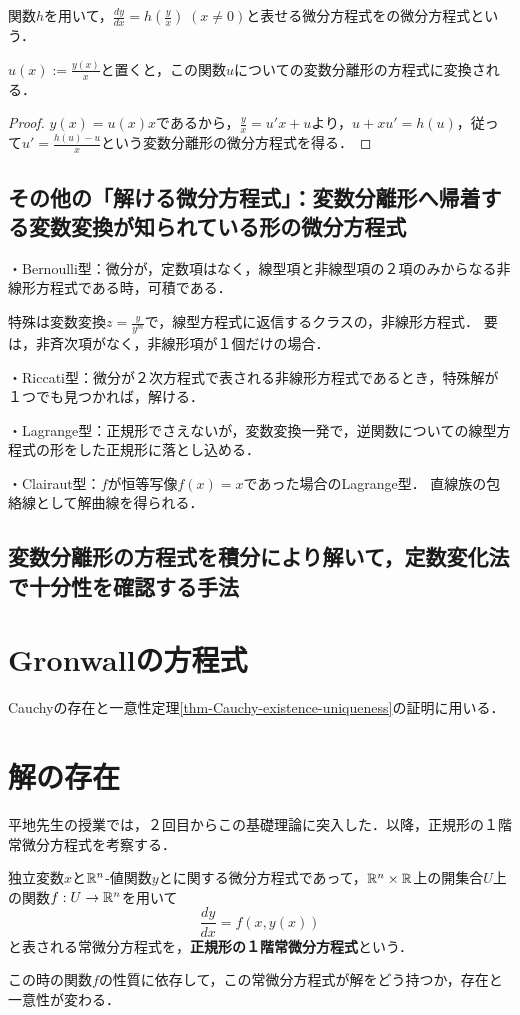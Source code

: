 \documentclass[uplatex,dvipdfmx]{jsreport}
\begin{document}
\begin{proposition}[同次形の方程式の解法]
    関数$h$を用いて，$\frac{dy}{dx}=h\left(\frac{y}{x}\right)\;(x\ne 0)$と表せる微分方程式をの微分方程式という．

    $u(x):=\frac{y(x)}{x}$と置くと，この関数$u$についての変数分離形の方程式に変換される．
\end{proposition}
\begin{proof}
    $y(x)=u(x)x$であるから，$\frac{y}{x}=u'x+u$より，$u+xu'=h(u)$，従って$u'=\frac{h(u)-u}{x}$という変数分離形の微分方程式を得る．
\end{proof}

\subsection{その他の「解ける微分方程式」：変数分離形へ帰着する変数変換が知られている形の微分方程式}

・Bernoulli型：微分が，定数項はなく，線型項と非線型項の２項のみからなる非線形方程式である時，可積である．

特殊は変数変換$z=\frac{y}{y^m}$で，線型方程式に返信するクラスの，非線形方程式．
要は，非斉次項がなく，非線形項が１個だけの場合．

・Riccati型：微分が２次方程式で表される非線形方程式であるとき，特殊解が１つでも見つかれば，解ける．

・Lagrange型：正規形でさえないが，変数変換一発で，逆関数についての線型方程式の形をした正規形に落とし込める．

・Clairaut型：$f$が恒等写像$f(x)=x$であった場合のLagrange型．
直線族の包絡線として解曲線を得られる．

\subsection{変数分離形の方程式を積分により解いて，定数変化法で十分性を確認する手法}

\section{Gronwallの方程式}
Cauchyの存在と一意性定理\ref{thm-Cauchy-existence-uniqueness}の証明に用いる．
\section{解の存在}
平地先生の授業では，２回目からこの基礎理論に突入した．以降，正規形の１階常微分方程式を考察する．
\begin{definition}
    独立変数$x$と$\mathbb{R}^n$-値関数$y$とに関する微分方程式であって，$\mathbb{R}^n\times\mathbb{R}$上の開集合$U$上の関数$f:U\to\mathbb{R}^n$を用いて
    \[\frac{dy}{dx}=f(x,y(x))\]
    と表される常微分方程式を，\textbf{正規形の１階常微分方程式}という．
\end{definition}
この時の関数$f$の性質に依存して，この常微分方程式が解をどう持つか，存在と一意性が変わる．
\end{document}
